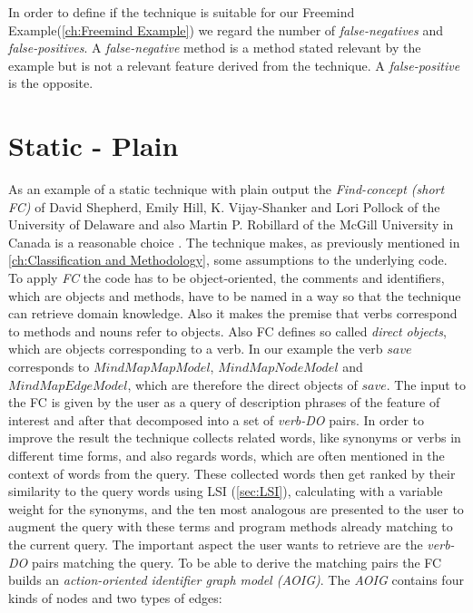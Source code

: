 In order to define if the technique is suitable for our Freemind Example(\autoref{ch:Freemind Example}) we regard the number of \textit{false-negatives} and \textit{false-positives}. A \textit{false-negative} method is a method stated relevant by the example but is not a relevant feature derived from the technique. A \textit{false-positive} is the opposite.

\section{Static - Plain}
\label{sec:find-concept}
As an example of a static technique with plain output the \emph{Find-concept (short FC)} of David Shepherd, Emily Hill, K. Vijay-Shanker and Lori Pollock of the University of Delaware and also Martin P. Robillard of the McGill University in Canada is a reasonable choice \cite{shepherd2007using}.
The technique makes, as previously mentioned in \autoref{ch:Classification and Methodology}, some assumptions to the underlying code. To apply \emph{FC} the code has to be object-oriented, the comments and identifiers, which are objects and methods, have to be named in a way so that the technique can retrieve domain knowledge. Also it makes the premise that verbs correspond to methods and nouns refer to objects. Also FC defines so called \textit{direct objects}, which are objects corresponding to a verb. In our example the verb $save$ corresponds to $MindMapMapModel$, $MindMapNodeModel$ and $MindMapEdgeModel$, which are therefore the direct objects of $save$.\newline
\emptyLine
The input to the FC is given by the user as a query of description phrases of the feature of interest and after that decomposed into a set of \textit{verb-DO} pairs. In order to improve the result the technique collects related words, like synonyms or verbs in different time forms, and also regards words, which are often mentioned in the context of words from the query. These collected words then get ranked by their similarity to the query words using LSI (\autoref{sec:LSI}), calculating with a variable weight for the synonyms, and the ten most analogous are presented to the user to augment the query with these terms and program methods already matching to the current query.\newline
\emptyLine
The important aspect the user wants to retrieve are the \textit{verb-DO} pairs matching the query. To be able to derive the matching pairs the FC builds an \textit{action-oriented identifier graph model (AOIG)}. The \textit{AOIG} contains four kinds of nodes and two types of edges:


